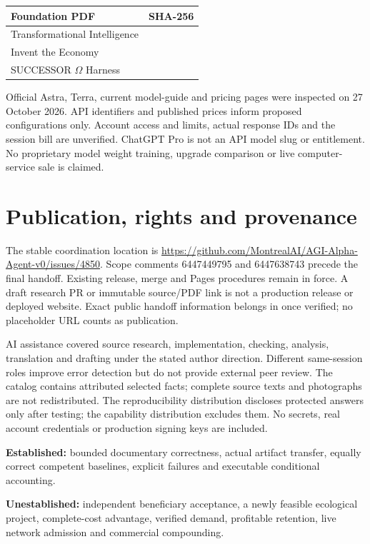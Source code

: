\documentclass[10pt]{article}
\begin{document}
\begin{tabularx}{\textwidth}{@{}p{42mm}Y@{}}
\toprule
Foundation PDF & SHA-256\\\midrule
Transformational Intelligence & \\
Invent the Economy & \\
SUCCESSOR $\Omega$ Harness & \\
\bottomrule
\end{tabularx}

Official Astra, Terra, current model-guide and pricing pages were inspected on 27 October 2026. API identifiers and published prices inform proposed configurations only. Account access and limits, actual response IDs and the session bill are unverified. ChatGPT Pro is not an API model slug or entitlement. No proprietary model weight training, upgrade comparison or live computer-service sale is claimed.

\section{Publication, rights and provenance}
The stable coordination location is \url{https://github.com/MontrealAI/AGI-Alpha-Agent-v0/issues/4850}. Scope comments 6447449795 and 6447638743 precede the final handoff. Existing release, merge and Pages procedures remain in force. A draft research PR or immutable source/PDF link is not a production release or deployed website. Exact public handoff information belongs in  once verified; no placeholder URL counts as publication.

AI assistance covered source research, implementation, checking, analysis, translation and drafting under the stated author direction. Different same-session roles improve error detection but do not provide external peer review. The catalog contains attributed selected facts; complete source texts and photographs are not redistributed. The reproducibility distribution discloses protected answers only after testing; the capability distribution excludes them. No secrets, real account credentials or production signing keys are included.

\begin{finding}[title=Qualification record]
\textbf{Established:} bounded documentary correctness, actual artifact transfer, equally correct competent baselines, explicit failures and executable conditional accounting.\par
\textbf{Unestablished:} independent beneficiary acceptance, a newly feasible ecological project, complete-cost advantage, verified demand, profitable retention, live network admission and commercial compounding.
\end{finding}
\end{document}
